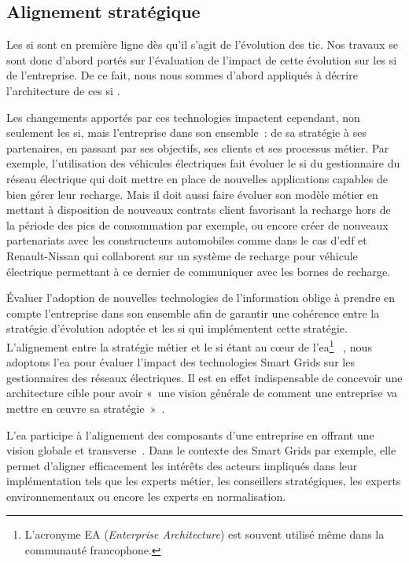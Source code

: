 \subsection{Alignement stratégique}

Les \gls{si} sont en première ligne dès qu'il s'agit de l'évolution des 
\gls{tic}. Nos 
travaux se sont donc d'abord portés sur l'évaluation de l'impact de cette 
évolution sur les \gls{si} de l'entreprise. De ce fait, nous nous sommes d'abord 
appliqués à décrire l'architecture de ces \gls{si} \cite{seghiri2015simulation}. 

Les changements apportés par ces technologies impactent cependant, non seulement 
les \gls{si}, mais l'entreprise dans son ensemble~: de sa stratégie à ses 
partenaires, en passant par ses objectifs, ses clients et ses processus métier. 
Par exemple, 
l'utilisation des véhicules électriques fait évoluer le \gls{si} du 
gestionnaire du réseau électrique qui doit mettre en place de nouvelles 
applications capables de bien gérer leur recharge. Mais il doit aussi faire 
évoluer son modèle métier en mettant à disposition de nouveaux contrats 
client favorisant la recharge hors de la période des pics de consommation par exemple, 
ou encore créer de nouveaux partenariats avec les constructeurs 
automobiles comme dans le cas d'\gls{edf} et Renault-Nissan qui collaborent sur 
un système de recharge pour véhicule électrique permettant à ce dernier de 
communiquer avec les bornes de recharge.

Évaluer l'adoption de nouvelles technologies de l'information oblige à prendre 
en compte l'entreprise dans son ensemble afin de garantir une cohérence entre 
la stratégie d'évolution adoptée et les \gls{si} qui implémentent cette 
stratégie. L'alignement entre la stratégie métier et le \gls{si} étant
au cœur de l'\gls{ea}\footnote{L'acronyme EA (\textit{Enterprise Architecture}) 
est souvent utilisé même dans la communauté francophone.}
~\cite{zachman1997enterprise}, nous
adoptons l'\gls{ea} pour évaluer l'impact des technologies Smart Grids sur les
gestionnaires des réseaux électriques. Il est en effet indispensable de
concevoir une architecture cible pour avoir  «~une vision générale de comment
une entreprise va mettre en œuvre sa stratégie~»~\cite{ross2006enterprise}.

L'\gls{ea} participe à l'alignement des composants d'une entreprise en offrant 
une vision globale et transverse~\cite{zachman1987framework}. Dans le contexte 
des 
Smart Grids par exemple, elle permet d'aligner efficacement les intérêts des 
acteurs impliqués dans leur implémentation tels que les experts métier, les 
conseillers stratégiques, les experts environnementaux ou encore les experts en 
normalisation.


